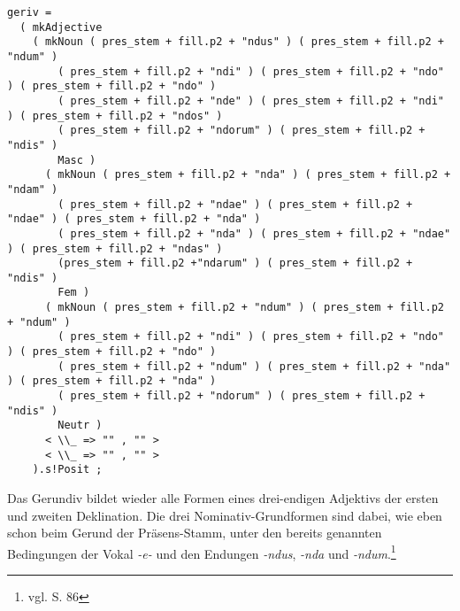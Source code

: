 \begin{lstlisting}[float=h!tp,caption={Ausschnitt aus der Funktion \texttt{mkDeponent} um Gerundiv-Verbformen zu bilden (vgl. \textbf{ResLat.gf})},label={GF-Res-MkDeponent-Geriv},basicstyle=\small]
geriv =
  ( mkAdjective
    ( mkNoun ( pres_stem + fill.p2 + "ndus" ) ( pres_stem + fill.p2 + "ndum" ) 
        ( pres_stem + fill.p2 + "ndi" ) ( pres_stem + fill.p2 + "ndo" ) ( pres_stem + fill.p2 + "ndo" ) 
        ( pres_stem + fill.p2 + "nde" ) ( pres_stem + fill.p2 + "ndi" ) ( pres_stem + fill.p2 + "ndos" ) 
        ( pres_stem + fill.p2 + "ndorum" ) ( pres_stem + fill.p2 + "ndis" ) 
        Masc )
      ( mkNoun ( pres_stem + fill.p2 + "nda" ) ( pres_stem + fill.p2 + "ndam" ) 
        ( pres_stem + fill.p2 + "ndae" ) ( pres_stem + fill.p2 + "ndae" ) ( pres_stem + fill.p2 + "nda" ) 
        ( pres_stem + fill.p2 + "nda" ) ( pres_stem + fill.p2 + "ndae" ) ( pres_stem + fill.p2 + "ndas" ) 
        (pres_stem + fill.p2 +"ndarum" ) ( pres_stem + fill.p2 + "ndis" ) 
        Fem )
      ( mkNoun ( pres_stem + fill.p2 + "ndum" ) ( pres_stem + fill.p2 + "ndum" ) 
        ( pres_stem + fill.p2 + "ndi" ) ( pres_stem + fill.p2 + "ndo" ) ( pres_stem + fill.p2 + "ndo" ) 
        ( pres_stem + fill.p2 + "ndum" ) ( pres_stem + fill.p2 + "nda" ) ( pres_stem + fill.p2 + "nda" ) 
        ( pres_stem + fill.p2 + "ndorum" ) ( pres_stem + fill.p2 + "ndis" ) 
        Neutr )
      < \\_ => "" , "" >
      < \\_ => "" , "" >
    ).s!Posit ;
\end{lstlisting}
Das Gerundiv bildet wieder alle Formen eines drei-endigen Adjektivs der ersten und zweiten Deklination. Die drei Nominativ-Grundformen sind dabei, wie eben schon beim Gerund der Präsens-Stamm, unter den bereits genannten Bedingungen der Vokal \textit{-e-} und den Endungen \textit{-ndus}, \textit{-nda} und \textit{-ndum}.\footnote{vgl. \cite{BAYER-LINDAUER1994} S. 86} \par
